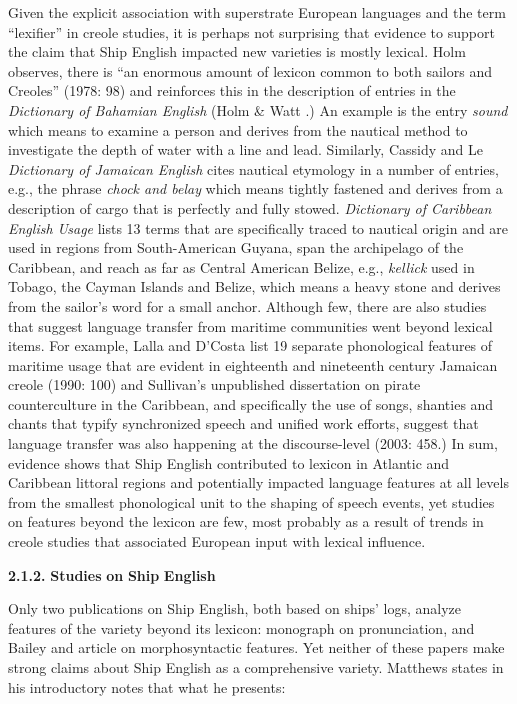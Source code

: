   Given the explicit association with superstrate European languages and the term “lexifier” in creole studies, it is perhaps not surprising that evidence to support the claim that Ship English impacted new varieties is mostly lexical. Holm observes, there is “an enormous amount of lexicon common to both sailors and Creoles” (1978: 98) and reinforces this in the description of entries in the \textit{Dictionary of Bahamian English} (Holm \& Watt \citealt{Schilling1982}.) An example is the entry \textit{sound} which means to examine a person and derives from the nautical method to investigate the depth of water with a line and lead. Similarly, Cassidy and Le  \textit{Dictionary of Jamaican English} cites nautical etymology in a number of entries, e.g., the phrase \textit{chock and belay} which means tightly fastened and derives from a description of cargo that is perfectly and fully stowed.  \textit{Dictionary of Caribbean English Usage} lists 13 terms that are specifically traced to nautical origin and are used in regions from South-American Guyana, span the archipelago of the Caribbean, and reach as far as Central American Belize, e.g., \textit{kellick} used in Tobago, the Cayman Islands and Belize, which means a heavy stone and derives from the sailor’s word for a small anchor. Although few, there are also studies that suggest language transfer from maritime communities went beyond lexical items. For example, Lalla and D’Costa list 19 separate phonological features of maritime usage that are evident in eighteenth and nineteenth century Jamaican creole (1990: 100) and Sullivan’s unpublished dissertation on pirate counterculture in the Caribbean, and specifically the use of songs, shanties and chants that typify synchronized speech and unified work efforts, suggest that language transfer was also happening at the discourse-level (2003: 458.) In sum, evidence shows that Ship English contributed to lexicon in Atlantic and Caribbean littoral regions and potentially impacted language features at all levels from the smallest phonological unit to the shaping of speech events, yet studies on features beyond the lexicon are few, most probably as a result of trends in creole studies that associated European input with lexical influence.  

\textbf{2.1.2.} \textbf{Studies} \textbf{on} \textbf{Ship} \textbf{English}

Only two publications on Ship English, both based on ships’ logs, analyze features of the variety beyond its lexicon: \citet{Matthews1935} monograph on pronunciation, and Bailey and  article on morphosyntactic features. Yet neither of these papers make strong claims about Ship English as a comprehensive variety. Matthews states in his introductory notes that what he presents:


